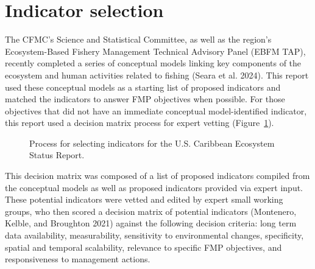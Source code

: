 \documentclass[
  letterpaper,
  oneside,
  open=any]{scrbook}
\begin{document}
\section{Indicator selection}\label{indicator-selection}

The CFMC's Science and Statistical Committee, as well as the region's
Ecosystem-Based Fishery Management Technical Advisory Panel (EBFM TAP),
recently completed a series of conceptual models linking key components
of the ecosystem and human activities related to fishing (Seara et al.
2024). This report used these conceptual models as a starting list of
proposed indicators and matched the indicators to answer FMP objectives
when possible. For those objectives that did not have an immediate
conceptual model-identified indicator, this report used a decision
matrix process for expert vetting (Figure~\ref{fig-flowchart}).

\begin{figure}


\caption{\label{fig-flowchart}Process for selecting indicators for the
U.S. Caribbean Ecosystem Status Report.}

\end{figure}%

This decision matrix was composed of a list of proposed indicators
compiled from the conceptual models as well as proposed indicators
provided via expert input. These potential indicators were vetted and
edited by expert small working groups, who then scored a decision matrix
of potential indicators (Montenero, Kelble, and Broughton 2021) against
the following decision criteria: long term data availability,
measurability, sensitivity to environmental changes, specificity,
spatial and temporal scalability, relevance to specific FMP objectives,
and responsiveness to management actions.
\end{document}

